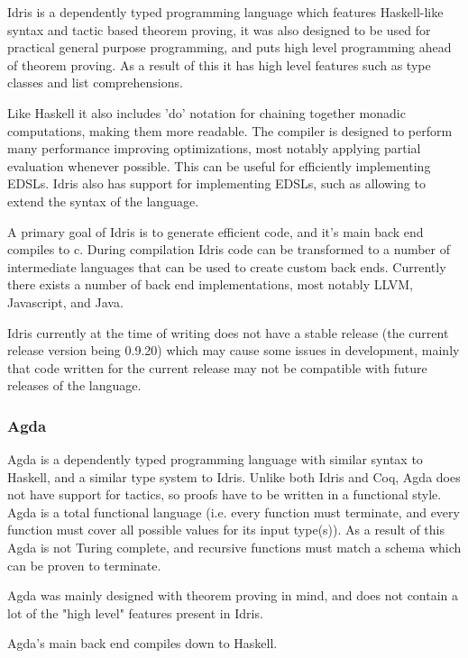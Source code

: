 Idris\cite{idris} is a dependently typed programming language which features Haskell-like syntax and tactic
based theorem proving, it was also designed to be used for practical general purpose programming, and puts high level
programming ahead of theorem proving. As a result of this it has high level features such as type classes and list 
comprehensions. 

Like Haskell it also includes 'do' notation for chaining together monadic computations, making them more readable. 
The compiler is designed to perform many performance improving
optimizations, most notably applying partial evaluation whenever possible. This can be useful for efficiently implementing
EDSLs\cite{edslidris}. Idris also has support for implementing EDSLs\cite{edslidris2}, such as allowing to extend the syntax of the language.   

A primary goal of Idris is to generate efficient code, and it's main back end compiles to c. During compilation
Idris code can be transformed to a number of intermediate languages that can be used to create custom back ends. 
Currently there exists a number of back end implementations, most notably LLVM, Javascript, and Java.

Idris currently at the time of writing does not have a stable release (the current release version being 0.9.20) which
may cause some issues in development, mainly that code written for the current release may not be compatible with future 
releases of the language.


\subsubsection{Agda}

Agda\cite{agda} is a dependently typed programming language with similar syntax to Haskell, and a similar
type system to Idris.
Unlike both Idris and Coq, Agda does not have support for tactics, so proofs have to be written
in a functional style. Agda is a total functional language\cite{total} (i.e. every function must terminate, and every function
must cover all possible values for its input type(s)). As a result of this Agda is not Turing complete, and
recursive functions must match a schema which can be proven to terminate.  

Agda was mainly designed with theorem proving in mind, and does not contain a lot of the "high level" 
features present in Idris.

Agda's main back end compiles down to Haskell.



